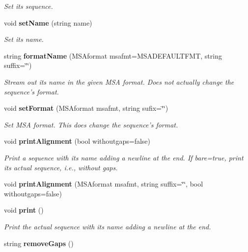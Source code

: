 \begin{CompactItemize}
\begin{CompactList}\small\item\em Set its sequence. \item\end{CompactList}\item 
void {\bf set\-Name} (string name)\label{classSequence_a14}

\begin{CompactList}\small\item\em Set its name. \item\end{CompactList}\item 
string {\bf format\-Name} (MSAformat msafmt=MSADEFAULTFMT, string suffix=\char`\"{}\char`\"{})\label{classSequence_a15}

\begin{CompactList}\small\item\em Stream out its name in the given MSA format. Does not actually change the sequence's format. \item\end{CompactList}\item 
void {\bf set\-Format} (MSAformat msafmt, string sufix=\char`\"{}\char`\"{})\label{classSequence_a16}

\begin{CompactList}\small\item\em Set MSA format. This does change the sequence's format. \item\end{CompactList}\item 
void {\bf print\-Alignment} (bool withoutgaps=false)\label{classSequence_a17}

\begin{CompactList}\small\item\em Print a sequence with its name adding a newline at the end. If bare=true, print its actual sequence, i.e., without gaps. \item\end{CompactList}\item 
void {\bf print\-Alignment} (MSAformat msafmt, string suffix=\char`\"{}\char`\"{}, bool withoutgaps=false)\label{classSequence_a18}

\item 
void {\bf print} ()\label{classSequence_a19}

\begin{CompactList}\small\item\em Print the actual sequence with its name adding a newline at the end. \item\end{CompactList}\item 
string {\bf remove\-Gaps} ()\label{classSequence_a20}


\end{CompactItemize}
